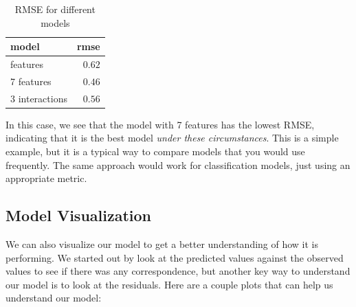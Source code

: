 \documentclass[
  letterpaper,
]{krantz}
\begin{document}
\begin{longtable}{lr}

\caption{\label{tbl-regression-compare}RMSE for different models}

\tabularnewline

\toprule
model & rmse \\ 
\midrule\addlinespace[2.5pt]
3 features & \textcolor[HTML]{404040}{$0.62$} \\ 
7 features & \textcolor[HTML]{404040}{$0.46$} \\ 
3 interactions & \textcolor[HTML]{404040}{$0.56$} \\ 
\bottomrule

\end{longtable}

In this case, we see that the model with 7 features has the lowest RMSE,
indicating that it is the best model \emph{under these circumstances}.
This is a simple example, but it is a typical way to compare models that
you would use frequently. The same approach would work for
classification models, just using an appropriate metric.

\subsection{Model Visualization}\label{model-visualization}

We can also visualize our model to get a better understanding of how it
is performing. We started out by look at the predicted values against
the observed values to see if there was any correspondence, but another
key way to understand our model is to look at the residuals. Here are a
couple plots that can help us understand our model:
\end{document}
